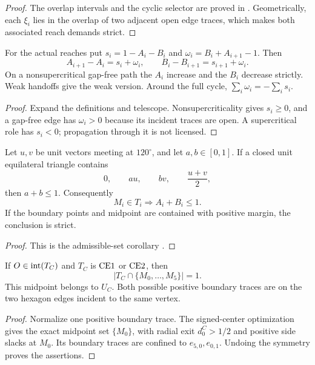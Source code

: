 \begin{proof}
The overlap intervals and the cyclic selector are proved in
.  Geometrically, each $\xi_i$ lies
in the overlap of two adjacent open edge traces, which makes both associated
reach demands strict.
\end{proof}

\begin{lemma}
\label{lem:boundary-deficit-identities}
For the actual reaches put $s_i=1-A_i-B_i$ and
$\omega_i=B_i+A_{i+1}-1$. Then
\[
 A_{i+1}-A_i=s_i+\omega_i,\qquad
 B_i-B_{i+1}=s_{i+1}+\omega_i.
\]
On a nonsupercritical gap-free path the $A_i$ increase and the $B_i$
decrease strictly. Weak handoffs give the weak version. Around the full
cycle, $\sum_i\omega_i=-\sum_i s_i$.
\end{lemma}
\begin{proof}
Expand the definitions and telescope. Nonsupercriticality gives $s_i\ge0$,
and a gap-free edge has $\omega_i>0$ because its incident traces are open.
A supercritical role has $s_i<0$; propagation through it is not licensed.
\end{proof}

\begin{lemma}
\label{lem:self-midpoint}
Let $u,v$ be unit vectors meeting at $120^\circ$, and let $a,b\in[0,1]$.
If a closed unit
equilateral triangle contains
\[
 0,\qquad au,\qquad bv,\qquad\frac{u+v}{2},
\]
then $a+b\le1$.  Consequently
\[
 M_i\in T_i\Longrightarrow A_i+B_i\le1.
\]
If the boundary points and midpoint are contained with positive margin, the
conclusion is strict.
\end{lemma}

\begin{proof}
This is the admissible-set corollary
.
\end{proof}

\begin{proposition}
\label{prop:unique-center-midpoint}
If $O\in\mathrm{int}(T_C)$ and $T_C$ is $\mathrm{CE1}$ or $\mathrm{CE2}$, then
\[
 \left|T_C\cap\{M_0,\ldots,M_5\}\right|=1.
\]
This midpoint belongs to $U_C$. Both possible positive boundary traces
are on the two hexagon edges incident to the same vertex.
\end{proposition}

\begin{proof}
Normalize one positive boundary trace.  The signed-center optimization
 gives the exact midpoint set
$\{M_0\}$, with radial exit $d_0^C>1/2$ and positive side slacks at
$M_0$. Its boundary traces are confined to $e_{5,0},e_{0,1}$.
Undoing the symmetry proves the assertions.
\end{proof}

